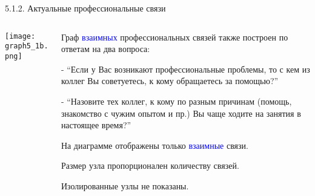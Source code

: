 \begin{frame}{5.1.2. Актуальные профессиональные связи}

\begin{columns}
\begin{column}{0.75\textwidth} 
\centering
          \texttt{[image: graph5\_1b.png]}
\end{column}
\begin{column}{0.25\textwidth} 

\tiny
Граф \textcolor{blue}{взаимных} профессиональных связей также построен по ответам на два вопроса:
\smallskip

- ``Если у Вас возникают профессиональные проблемы, то с кем из коллег Вы советуетесь, к кому обращаетесь за помощью?''
\smallskip

- ``Назовите тех коллег, к кому по разным причинам (помощь, знакомство с чужим опытом и пр.) Вы чаще ходите на занятия в настоящее время?''
\smallskip

На диаграмме отображены только \textcolor{blue}{взаимные} связи.
\smallskip

Размер узла пропорционален количеству связей.
\smallskip

Изолированные узлы не показаны.
\end{column}
\end{columns}
\end{frame}


